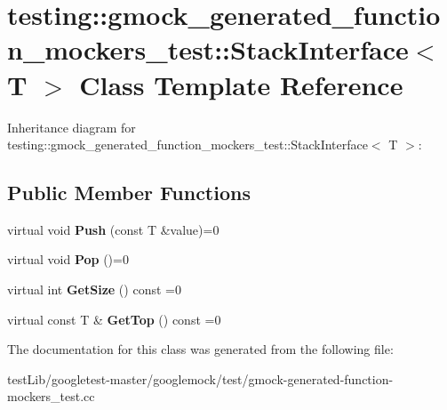 \hypertarget{classtesting_1_1gmock__generated__function__mockers__test_1_1StackInterface}{}\section{testing\+:\+:gmock\+\_\+generated\+\_\+function\+\_\+mockers\+\_\+test\+:\+:Stack\+Interface$<$ T $>$ Class Template Reference}
\label{classtesting_1_1gmock__generated__function__mockers__test_1_1StackInterface}


Inheritance diagram for testing\+:\+:gmock\+\_\+generated\+\_\+function\+\_\+mockers\+\_\+test\+:\+:Stack\+Interface$<$ T $>$\+:
\subsection*{Public Member Functions}
\begin{DoxyCompactItemize}
\item 
\mbox{\label{classtesting_1_1gmock__generated__function__mockers__test_1_1StackInterface_a49448f6195021fee947d37b80b6e5d30}} 
virtual void {\bfseries Push} (const T \&value)=0
\item 
\mbox{\label{classtesting_1_1gmock__generated__function__mockers__test_1_1StackInterface_a1a6646d1d9febe90c607b9b3e4539b67}} 
virtual void {\bfseries Pop} ()=0
\item 
\mbox{\label{classtesting_1_1gmock__generated__function__mockers__test_1_1StackInterface_a537ec8647a2333f50e5f923a85b90eba}} 
virtual int {\bfseries Get\+Size} () const =0
\item 
\mbox{\label{classtesting_1_1gmock__generated__function__mockers__test_1_1StackInterface_af36e32b9ae568100363466d1ebf95364}} 
virtual const T \& {\bfseries Get\+Top} () const =0
\end{DoxyCompactItemize}


The documentation for this class was generated from the following file\+:\begin{DoxyCompactItemize}
\item 
test\+Lib/googletest-\/master/googlemock/test/gmock-\/generated-\/function-\/mockers\+\_\+test.\+cc\end{DoxyCompactItemize}
